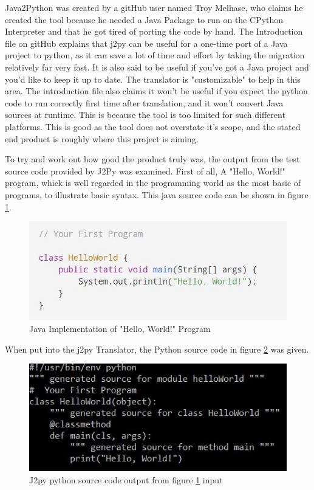\documentclass{l4proj}
\begin{document}
Java2Python was created by a gitHub user named Troy Melhase, who claims he created the tool because he needed a Java Package to run on the CPython Interpreter and that he got tired of porting the code by hand. The Introduction file on gitHub explains that j2py can be useful for a one-time port of a Java project to python, as it can save a lot of time and effort by taking the migration relatively far very fast. It is also said to be useful if you've got a Java project and you'd like to keep it up to date. The translator is "customizable" to help in this area. The introduction file also claims it won't be useful if you expect the python code to run correctly first time after translation, and it won't convert Java sources at runtime. This is because the tool is too limited for such different platforms. This is good as the tool does not overstate it's scope, and the stated end product is roughly where this project is aiming. 

To try and work out how good the product truly was, the output from the test source code provided by J2Py was examined. First of all, A "Hello, World!" program, whick is well regarded in the programming world as the most basic of programs, to illustrate basic syntax. This java source code can be shown in figure \ref{fig:helloWorldJava}.

\begin{figure}[htb]
    \centering
    \includegraphics[width=1\linewidth]{images/helloWorldJava.JPG}
        \caption{Java Implementation of "Hello, World!" Program
    }
    \label{fig:helloWorldJava} 
\end{figure}

When put into the j2py Translator, the Python source code in figure \ref{fig:helloWorldJ2py} was given.

\begin{figure}[htb]
    \centering
    \includegraphics[width=1\linewidth]{images/helloWorldJ2py.JPG}
        \caption{J2py python source code output from figure \ref{fig:helloWorldJava} input
    }
    \label{fig:helloWorldJ2py} 
\end{figure}
\end{document}
